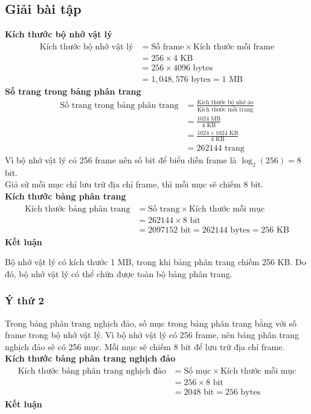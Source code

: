 \documentclass[12pt, letterpaper]{article}
\begin{document}
\subsection{Giải bài tập}
\textbf{Kích thước bộ nhớ vật lý}
\begin{align*}
    \text{Kích thước bộ nhớ vật lý} &= \text{Số frame} \times \text{Kích thước mỗi frame} \\
    &= 256 \times 4 \text{ KB} \\
    &= 256 \times 4096 \text{ bytes} \\
    &= 1,048,576 \text{ bytes} = 1 \text{ MB}
\end{align*}
\textbf{Số trang trong bảng phân trang}
\begin{align*}
    \text{Số trang trong bảng phân trang} &= \frac{\text{Kích thước bộ nhớ ảo}}{\text{Kích thước mỗi trang}} \\
    &= \frac{1024 \text{ MB}}{4 \text{ KB}} \\
    &= \frac{1024 \times 1024 \text{ KB}}{4 \text{ KB}} \\
    &= 262144 \text{ trang}
\end{align*}
Vì bộ nhớ vật lý có 256 frame nên số bit để biểu diễn frame là $\log_2(256) = 8$ bit. \\
Giả sử  mỗi mục chỉ lưu trữ địa chỉ frame, thì mỗi mục sẽ chiếm 8 bit. \\
\textbf{Kích thước bảng phân trang}
\begin{align*}
    \text{Kích thước bảng phân trang} &= \text{Số trang} \times \text{Kích thước mỗi mục} \\
    &= 262144 \times 8 \text{ bit} \\
    &= 2097152 \text{ bit} = 262144 \text{ bytes} = 256 \text{ KB}
\end{align*}
\textbf{Kết luận}

Bộ nhớ vật lý có kích thước 1 MB, trong khi bảng phân trang chiếm 256 KB. Do đó, bộ nhớ vật lý có thể chứa được toàn bộ bảng phân trang. \\
\subsubsection{Ý thứ 2}
Trong bảng phân trang nghịch đảo, số mục trong bảng phân trang bằng với số frame trong bộ nhớ vật lý. Vì bộ nhớ vật lý có 256 frame, nên bảng phân trang nghịch đảo sẽ có 256 mục. Mỗi mục sẽ chiếm 8 bit để lưu trữ địa chỉ frame. \\
\textbf{Kích thước bảng phân trang nghịch đảo}
\begin{align*}
    \text{Kích thước bảng phân trang nghịch đảo} &= \text{Số mục} \times \text{Kích thước mỗi mục} \\
    &= 256 \times 8 \text{ bit} \\
    &= 2048 \text{ bit} = 256 \text{ bytes}
\end{align*}
\textbf{Kết luận}
\end{document}
